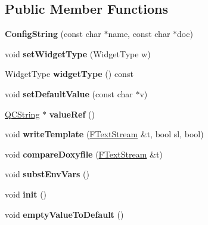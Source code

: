 \subsection*{Public Member Functions}
\begin{DoxyCompactItemize}
\item 
\mbox{\label{class_config_string_af35e791e48a93c96bdba2df9ca848f28}} 
{\bfseries Config\+String} (const char $\ast$name, const char $\ast$doc)
\item 
\mbox{\label{class_config_string_a35abeb5e79ca5812affa17d5ff67f5ee}} 
void {\bfseries set\+Widget\+Type} (Widget\+Type w)
\item 
\mbox{\label{class_config_string_a7cad733ff76bb0fc898c9daffb578fd2}} 
Widget\+Type {\bfseries widget\+Type} () const
\item 
\mbox{\label{class_config_string_aabfc2165fcdafd51ec0668d3fe4f7b35}} 
void {\bfseries set\+Default\+Value} (const char $\ast$v)
\item 
\mbox{\label{class_config_string_ab3a24655083aa0ed8fb54bab4e060a68}} 
\mbox{\hyperlink{class_q_c_string}{Q\+C\+String}} $\ast$ {\bfseries value\+Ref} ()
\item 
\mbox{\label{class_config_string_a9ba817d1e46850c6000fe2dd6d03ff8e}} 
void {\bfseries write\+Template} (\mbox{\hyperlink{class_f_text_stream}{F\+Text\+Stream}} \&t, bool sl, bool)
\item 
\mbox{\label{class_config_string_a788e3fd75e97fa115bf530847066e314}} 
void {\bfseries compare\+Doxyfile} (\mbox{\hyperlink{class_f_text_stream}{F\+Text\+Stream}} \&t)
\item 
\mbox{\label{class_config_string_a39a8a773cf8ef1c5b31fa1e02b49cb32}} 
void {\bfseries subst\+Env\+Vars} ()
\item 
\mbox{\label{class_config_string_ace07ea2ad1492f238771682286a7b79e}} 
void {\bfseries init} ()
\item 
\mbox{\label{class_config_string_a384bcc7b37cda8eefcfda7d341d11032}} 
void {\bfseries empty\+Value\+To\+Default} ()
\end{DoxyCompactItemize}
